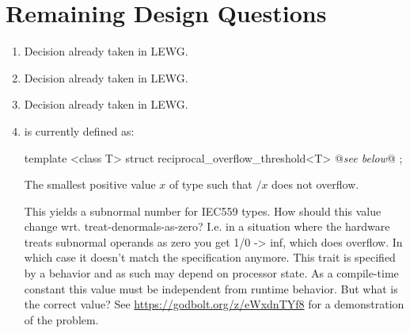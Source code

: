 \section{Remaining Design Questions}
\begin{enumerate}
  \item Decision already taken in LEWG.

  \item Decision already taken in LEWG.

  \item Decision already taken in LEWG.

  \item {} is currently defined as:
  \begin{wgText}
\begin{itemdecl}
  template <class T> struct reciprocal_overflow_threshold<T> { @\emph{see below}@ };
\end{itemdecl}
\begin{itemdescr}
\setcounter{Paras}{8}
  \pnum The smallest positive value $x$ of type  such that $/x$ does not overflow.
\end{itemdescr}
  \end{wgText}
  This yields a subnormal number for IEC559 types.
  How should this value change wrt. treat-denormals-as-zero?
  I.e. in a situation where the hardware treats subnormal operands as zero you get 1/0 -> inf, which does overflow.
  In which case it doesn't match the specification anymore.
  This trait is specified by a behavior and as such may depend on processor state.
  As a compile-time constant this value must be independent from runtime behavior.
  But what is the correct value?
  See \url{https://godbolt.org/z/eWxdnTYf8} for a demonstration of the problem.


\end{enumerate}
